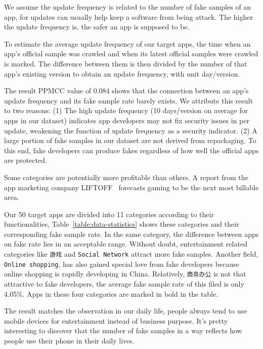 We assume the update frequency is related to the number of fake samples of an app, for updates can usually help keep a software from being attack.
The higher the update frequency is, the safer an app is supposed to be.

To estimate the average update frequency of our target apps, the time when an app's official sample was crawled and when its latest official samples were crawled is marked.
The difference between them is then divided by the number of that app's existing version to obtain an update frequency, with unit day/version.

The result PPMCC value of 0.084 shows that the connection between an app's update frequency and its fake sample rate barely exists.
We attribute this result to two reasons:
(1) The high update frequency (10 days/version on average for apps in our dataset) indicates app developers may not fix security issues in per update, weakening the function of update frequency as a security indicator.
(2) A large portion of fake samples in our dataset are not derived from repackaging. To this end, fake developers can produce fakes regardless of how well the official apps are protected.

Some categories are potentially more profitable than others.
A report from the app marketing company LIFTOFF~\cite{LIFTOFF_report} forecasts gaming to be the next most billable area.

Our 50 target apps are divided into 11 categories according to their functionalities, Table~\ref{table:data-statistics} shows these categories and their corresponding fake sample rate.
In the same category, the difference between apps on fake rate lies in an acceptable range.
Without doubt, entertainment related categories like \texttt{游戏} and \texttt{Social Network} attract more fake samples.
Another field, \texttt{Online shopping}, has also gained special love from fake developers because online shopping is rapidly developing in China.
Relatively, \texttt{商务办公} is not that attractive to fake developers, the average fake sample rate of this filed is only 4.05\%.
Apps in these four categories are marked in bold in the table.

The result matches the observation in our daily life, people always tend to use mobile devices for entertainment instead of business purpose.
It's pretty interesting to discover that the number of fake samples in a way reflects how people use their phone in their daily lives.

